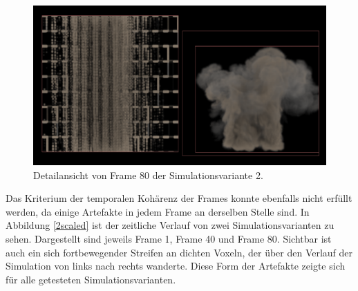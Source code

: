 \begin{figure}[ht]
    \centering
    \includegraphics[width=14cm]{bilder/2Frame80.PNG}
    \caption{Detailansicht von Frame 80 der Simulationsvariante 2.}
    \label{frame80}
\end{figure}

Das Kriterium der temporalen Kohärenz der Frames konnte ebenfalls nicht erfüllt werden, da einige Artefakte in jedem Frame an derselben Stelle sind. In Abbildung \ref{2scaled} ist der zeitliche Verlauf von zwei Simulationsvarianten zu sehen. Dargestellt sind jeweils Frame 1, Frame 40 und Frame 80. Sichtbar ist auch ein sich fortbewegender Streifen an dichten Voxeln, der über den Verlauf der Simulation von links nach rechts wanderte. Diese Form der Artefakte zeigte sich für alle getesteten Simulationsvarianten. \\

